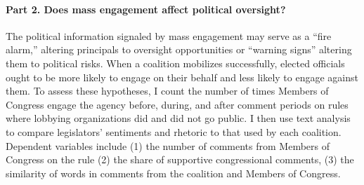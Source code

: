 \paragraph{Part 2. Does mass engagement affect political oversight?} The political information signaled by mass engagement may serve as a ``fire alarm,'' altering principals to oversight opportunities or ``warning signs'' altering them to political risks.
When a coalition mobilizes successfully, %
elected officials ought to be more likely to engage on their behalf and less likely to engage against them.
To assess these hypotheses, I count the number of times Members of Congress engage the agency before, during, and after comment periods on rules where lobbying organizations did and did not go public. I then use text analysis to compare legislators' sentiments and rhetoric to that used by each coalition.
Dependent variables include 
(1) the number of comments from Members of Congress on the rule %
(2) the share of supportive congressional comments, %
(3) the similarity of words in comments from the coalition and Members of Congress. 

